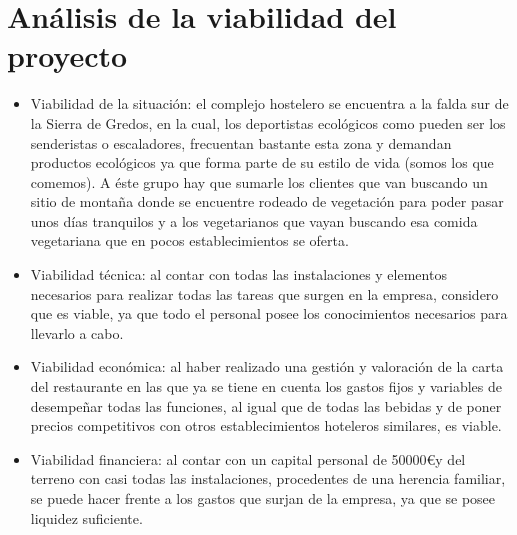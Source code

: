 \chapter{Análisis de la viabilidad del proyecto }
\label{chap:viabilidad}

\begin{itemize}
\item Viabilidad de la situación: el complejo hostelero se encuentra a la falda sur de la Sierra de Gredos, en la cual, los deportistas ecológicos como pueden ser los senderistas o escaladores, frecuentan bastante esta zona y demandan productos ecológicos ya que forma parte de su estilo de vida (somos los que comemos). A éste grupo hay que sumarle los clientes que van buscando un sitio de montaña donde se encuentre rodeado de vegetación para poder pasar unos días tranquilos y a los vegetarianos que vayan buscando esa comida vegetariana que en pocos establecimientos se oferta.
\item Viabilidad técnica: al contar con todas las instalaciones y elementos necesarios para realizar todas las tareas que surgen en la empresa, considero que es viable, ya que todo el personal posee los conocimientos necesarios para llevarlo a cabo.
\item Viabilidad económica: al haber realizado una gestión y valoración de la carta del restaurante en las que ya se tiene en cuenta los gastos  fijos y variables de desempeñar todas las funciones, al igual que de todas las bebidas y de poner precios competitivos con otros establecimientos hoteleros similares, es viable.
\item Viabilidad financiera: al contar con un capital personal de 50000\euro y del terreno con casi todas las instalaciones, procedentes de una herencia familiar,  se puede hacer frente a los gastos que surjan de la empresa, ya que se posee liquidez suficiente.
\end{itemize}
